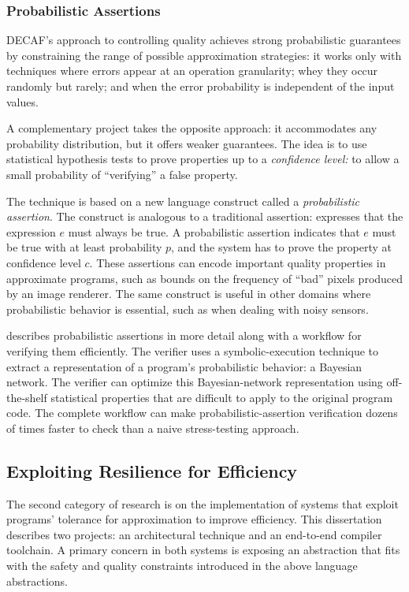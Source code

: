 \subsubsection{Probabilistic Assertions}

DECAF's approach to controlling quality achieves strong probabilistic
guarantees by constraining the range of possible approximation strategies:
it works only with techniques where errors appear at an operation granularity;
whey they occur randomly but rarely; and when the error probability is
independent of the input values.

A complementary project takes the opposite approach:
it accommodates any probability distribution, but it offers weaker
guarantees.
The idea is to use statistical hypothesis tests to prove properties up to a
\emph{confidence level:}
to allow a small probability of ``verifying'' a false property.

The technique is based on a new language construct called a
\emph{probabilistic assertion}.
The construct is analogous to a traditional assertion: 
expresses that the expression $e$ must always be true.
A probabilistic assertion  indicates that $e$ must
be true with at least probability $p$, and the system has to prove the
property at confidence level $c$.
These assertions can encode important quality properties in approximate
programs, such as bounds on the frequency of ``bad'' pixels produced by an
image renderer.
The same construct is useful in other domains where probabilistic behavior is
essential, such as when dealing with noisy sensors.

 describes probabilistic assertions in more detail
along with a workflow for verifying them efficiently.
The verifier uses a symbolic-execution technique to extract a representation
of a program's probabilistic behavior: a Bayesian network.
The verifier can optimize this Bayesian-network representation using
off-the-shelf statistical properties that are difficult to apply to the
original program code.
The complete workflow can make probabilistic-assertion verification dozens of
times faster to check than a naive stress-testing approach.

\subsection{Exploiting Resilience for Efficiency}

The second category of research is on the implementation of systems that
exploit programs' tolerance for approximation to improve efficiency.
This dissertation describes two projects: an architectural technique and an
end-to-end compiler toolchain.
A primary concern in both systems is exposing an abstraction that fits with
the safety and quality constraints introduced in the above language
abstractions.

